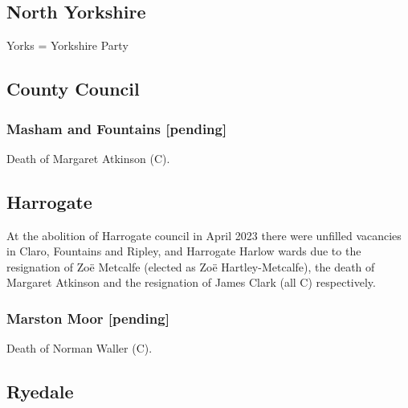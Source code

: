 \documentclass[a4paper,openany]{book}
\begin{document}
\begin{resultsiii}
\section{North Yorkshire}

Yorks = Yorkshire Party

\subsection*{County Council}

\subsubsection*{Masham and Fountains \hspace*{\fill}\nolinebreak[1]%
	\enspace\hspace*{\fill}
	[pending]}


Death of Margaret Atkinson (C).

\subsection*{Harrogate}

At the abolition of Harrogate council in April 2023 there were unfilled vacancies in Claro, Fountains and Ripley, and Harrogate Harlow wards due to the resignation of Zoë Metcalfe (elected as Zoë Hartley-Metcalfe), the death of Margaret Atkinson and the resignation of James Clark (all C) respectively.%
%
%

\subsubsection*{Marston Moor \hspace*{\fill}\nolinebreak[1]%
	\enspace\hspace*{\fill}
	[pending]}


Death of Norman Waller (C).%

\subsection*{Ryedale}


\end{resultsiii}
\end{document}
